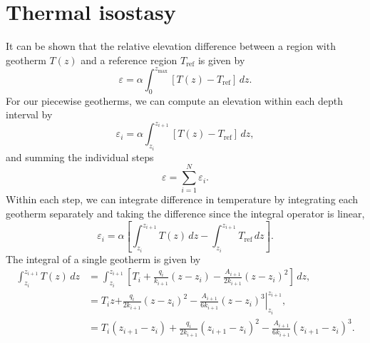 \documentclass[final,a4paper,12pt]{article}
\begin{document}
\section{Thermal isostasy}\label{apx:tis}
It can be shown that the relative elevation difference between a region with
geotherm $T(z)$ and a reference region $T_{\text{ref}}$ is given by
\begin{equation}
    \varepsilon = \alpha \int_{0}^{z_{\text{max}}} [T(z) - T_{\text{ref}}] \,dz.
\end{equation}
For our piecewise geotherms, we can compute an elevation within each depth
interval by
\begin{equation}
    \varepsilon_i = \alpha \int_{z_i}^{z_{i+1}} [T(z) - T_{\text{ref}}] \,dz,
\end{equation}
and summing the individual steps
\begin{equation}
    \varepsilon = \sum_{i = 1}^N \varepsilon_i.
\end{equation}
Within each step, we can integrate difference in temperature by integrating each
geotherm separately and taking the difference since the integral operator is
linear,
\begin{equation}
    \varepsilon_i = \alpha \left[
    \int_{z_i}^{z_{i+1}} T(z) \,dz - \int_{z_i}^{z_{i+1}} T_{\text{ref}} \,dz
    \right].
\end{equation}
The integral of a single geotherm is given by
\begin{align}
    \int_{z_i}^{z_{i+1}} T(z) \,dz & = \int_{z_i}^{z_{i+1}}
        \left[ T_{i} 
        + \frac{q_i}{k_{i+1}} (z - z_i)
        - \frac{A_{i+1}}{2 k_{i+1}} (z - z_i)^2
        \right] \,dz, \\
    & = T_{i} z \left.
        + \frac{q_i}{2 k_{i+1}} (z - z_i)^2
        - \frac{A_{i+1}}{6 k_{i+1}} (z - z_i)^3
        \right|_{z_i}^{z_{i+1}}, \\
    & = T_{i} (z_{i+1} - z_i) 
        + \frac{q_i}{2 k_{i+1}} (z_{i+1} - z_i)^2
        - \frac{A_{i+1}}{6 k_{i+1}} (z_{i+1} - z_i)^3 .
\end{align}
\end{document}
